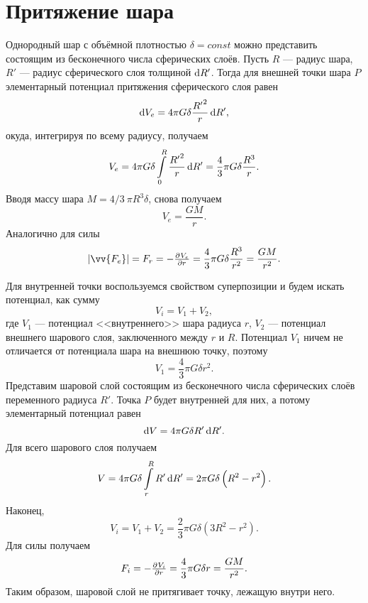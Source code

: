 \documentclass[11pt, a4paper]{article}
\theoremstyle{plain}
\theoremstyle{definition}
\theoremstyle{remark}
\begin{document}
\section{Притяжение шара}
Однородный шар с объёмной плотностью $\delta=const$ можно представить состоящим из бесконечного числа
сферических слоёв. Пусть $R$ --- радиус шара,
$R'$ --- радиус сферического слоя толщиной $\dif R'$. Тогда для внешней точки шара $P$ элементарный
потенциал притяжения сферического слоя равен
\begin{equation*}
    \dif V_e = 4\pi G\delta\dfrac{{R'}^2}{r}\dif R',
\end{equation*}
окуда, интегрируя по всему радиусу, получаем
\begin{equation*}
    V_e = 4\pi G\delta \int\limits_{0}^{R}\dfrac{{R'}^2}{r}\dif R' = 
    \dfrac{4}{3}\pi G\delta\dfrac{R^3}{r}.
\end{equation*}
Вводя массу шара $M = 4/3\ \pi R^3 \delta$, снова получаем
\begin{equation*}
    V_e = \dfrac{GM}{r}.
\end{equation*}
Аналогично для силы
\begin{equation*}
    |\vv{F_e}| = F_r = -\pd{V_e}{r} = \dfrac{4}{3}\pi G\delta \dfrac{R^3}{r^2} = 
    \dfrac{GM}{r^2}.
\end{equation*}

Для внутренней точки воспользуемся свойством суперпозиции и будем искать потенциал, как сумму
\begin{equation*}
    V_i = V_1 + V_2,
\end{equation*}
где $V_1$ --- потенциал <<внутреннего>> шара радиуса $r$, $V_2$ --- потенциал внешнего шарового
слоя, заключенного между $r$ и $R$. Потенциал $V_1$ ничем не отличается от потенциала шара на
внешнюю точку, поэтому
\begin{equation*}
    V_1 = \dfrac{4}{3}\pi G\delta r^2.
\end{equation*}
Представим шаровой слой состоящим из бесконечного числа сферических слоёв переменного радиуса $R'$.
Точка $P$ будет внутренней для них, а потому элементарный потенциал равен
\begin{equation*}
    \dif V = 4\pi G\delta R'\dif R'.
\end{equation*}
Для всего шарового слоя получаем
\begin{equation*}
    V = 4\pi G\delta \int\limits_{r}^{R} R'\dif R' = 2\pi G\delta \left( R^2 - r^2 \right).
\end{equation*}
Наконец,
\begin{equation*}
    V_i = V_1 + V_2 = \dfrac{2}{3}\pi G\delta \left( 3R^2 - r^2 \right).
\end{equation*}
Для силы получаем
\begin{equation*}
    F_i = -\pd{V_i}{r} = \dfrac{4}{3}\pi G\delta r = \dfrac{GM}{r^2}.
\end{equation*}
Таким образом, шаровой слой не притягивает точку, лежащую внутри него.
\end{document}
